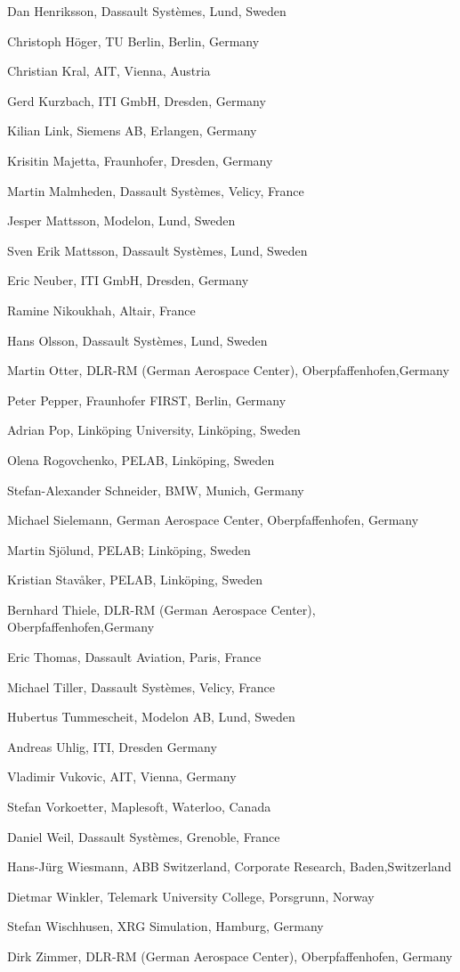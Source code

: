 \begin{contributors}
\item Dan Henriksson, Dassault Systèmes, Lund, Sweden
\item Christoph Höger, TU Berlin, Berlin, Germany
\item Christian Kral, AIT, Vienna, Austria
\item Gerd Kurzbach, ITI GmbH, Dresden, Germany
\item Kilian Link, Siemens AB, Erlangen, Germany
\item Krisitin Majetta, Fraunhofer, Dresden, Germany
\item Martin Malmheden, Dassault Systèmes, Velicy, France
\item Jesper Mattsson, Modelon, Lund, Sweden
\item Sven Erik Mattsson, Dassault Systèmes, Lund, Sweden
\item Eric Neuber, ITI GmbH, Dresden, Germany
\item Ramine Nikoukhah, Altair, France
\item Hans Olsson, Dassault Systèmes, Lund, Sweden
\item Martin Otter, DLR-RM (German Aerospace Center), Oberpfaffenhofen,Germany
\item Peter Pepper, Fraunhofer FIRST, Berlin, Germany
\item Adrian Pop, Linköping University, Linköping, Sweden
\item Olena Rogovchenko, PELAB, Linköping, Sweden
\item Stefan-Alexander Schneider, BMW, Munich, Germany
\item Michael Sielemann, German Aerospace Center, Oberpfaffenhofen, Germany
\item Martin Sjölund, PELAB; Linköping, Sweden
\item Kristian Stavåker, PELAB, Linköping, Sweden
\item Bernhard Thiele, DLR-RM (German Aerospace Center), Oberpfaffenhofen,Germany
\item Eric Thomas, Dassault Aviation, Paris, France
\item Michael Tiller, Dassault Systèmes, Velicy, France
\item Hubertus Tummescheit, Modelon AB, Lund, Sweden
\item Andreas Uhlig, ITI, Dresden Germany
\item Vladimir Vukovic, AIT, Vienna, Germany
\item Stefan Vorkoetter, Maplesoft, Waterloo, Canada
\item Daniel Weil, Dassault Systèmes, Grenoble, France
\item Hans-Jürg Wiesmann, ABB Switzerland, Corporate Research, Baden,Switzerland
\item Dietmar Winkler, Telemark University College, Porsgrunn, Norway
\item Stefan Wischhusen, XRG Simulation, Hamburg, Germany
\item Dirk Zimmer, DLR-RM (German Aerospace Center), Oberpfaffenhofen, Germany
\end{contributors}


